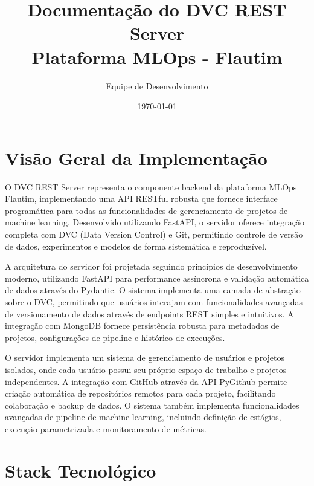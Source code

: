 \documentclass[12pt,a4paper]{article}
\begin{document}
\title{\Huge\textbf{Documentação do DVC REST Server}\\\vspace{0.5cm}\Large Plataforma MLOps - Flautim}
\author{Equipe de Desenvolvimento}
\date{\today}

\maketitle

\tableofcontents
\newpage

\section{Visão Geral da Implementação}

O DVC REST Server representa o componente backend da plataforma MLOps Flautim, implementando uma API RESTful robusta que fornece interface programática para todas as funcionalidades de gerenciamento de projetos de machine learning. Desenvolvido utilizando FastAPI, o servidor oferece integração completa com DVC (Data Version Control) e Git, permitindo controle de versão de dados, experimentos e modelos de forma sistemática e reproduzível.

A arquitetura do servidor foi projetada seguindo princípios de desenvolvimento moderno, utilizando FastAPI para performance assíncrona e validação automática de dados através do Pydantic. O sistema implementa uma camada de abstração sobre o DVC, permitindo que usuários interajam com funcionalidades avançadas de versionamento de dados através de endpoints REST simples e intuitivos. A integração com MongoDB fornece persistência robusta para metadados de projetos, configurações de pipeline e histórico de execuções.

O servidor implementa um sistema de gerenciamento de usuários e projetos isolados, onde cada usuário possui seu próprio espaço de trabalho e projetos independentes. A integração com GitHub através da API PyGithub permite criação automática de repositórios remotos para cada projeto, facilitando colaboração e backup de dados. O sistema também implementa funcionalidades avançadas de pipeline de machine learning, incluindo definição de estágios, execução parametrizada e monitoramento de métricas.

\section{Stack Tecnológico}
\end{document}
